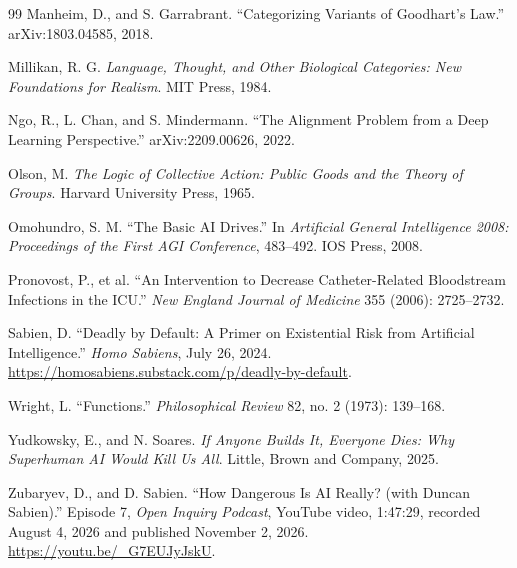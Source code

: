 \documentclass[11pt]{article}
\begin{document}
\begin{thebibliography}{99}
Manheim, D., and S. Garrabrant. ``Categorizing Variants of Goodhart's Law.'' arXiv:1803.04585, 2018.

Millikan, R. G. \textit{Language, Thought, and Other Biological Categories: New Foundations for Realism}. MIT Press, 1984.

Ngo, R., L. Chan, and S. Mindermann. ``The Alignment Problem from a Deep Learning Perspective.'' arXiv:2209.00626, 2022.

Olson, M. \textit{The Logic of Collective Action: Public Goods and the Theory of Groups}. Harvard University Press, 1965.

Omohundro, S. M. ``The Basic AI Drives.'' In \textit{Artificial General Intelligence 2008: Proceedings of the First AGI Conference}, 483--492. IOS Press, 2008.

Pronovost, P., et al. ``An Intervention to Decrease Catheter-Related Bloodstream Infections in the ICU.'' \textit{New England Journal of Medicine} 355 (2006): 2725--2732.

Sabien, D. ``Deadly by Default: A Primer on Existential Risk from Artificial Intelligence.'' \textit{Homo Sabiens}, July 26, 2024. \url{https://homosabiens.substack.com/p/deadly-by-default}.

Wright, L. ``Functions.'' \textit{Philosophical Review} 82, no. 2 (1973): 139--168.

Yudkowsky, E., and N. Soares. \textit{If Anyone Builds It, Everyone Dies: Why Superhuman AI Would Kill Us All}. Little, Brown and Company, 2025.

Zubaryev, D., and D. Sabien. ``How Dangerous Is AI Really? (with Duncan Sabien).'' Episode 7, \textit{Open Inquiry Podcast}, YouTube video, 1:47:29, recorded August 4, 2026 and published November 2, 2026. \url{https://youtu.be/_G7EUJyJskU}.

\end{thebibliography}
\end{document}
